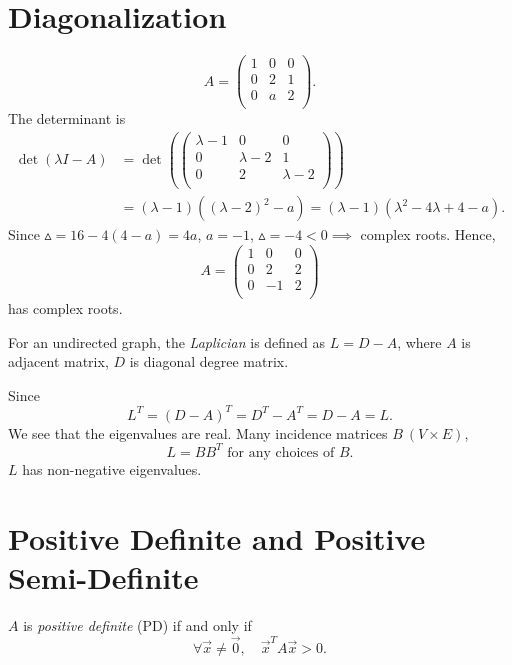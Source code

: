 \section{Diagonalization}
\begin{eg}
	\[
		A = \begin{pmatrix}
			1 & 0 & 0 \\
			0 & 2 & 1 \\
			0 & a & 2 \\
		\end{pmatrix}.
	\]
	The determinant is
	\[
		\begin{split}
			\det(\lambda I - A) &= \det \left(  \begin{pmatrix}
				\lambda - 1 & 0            & 0             \\
				0           & \lambda -  2 & 1             \\
				0           & 2            & \lambda -   2 \\
			\end{pmatrix}\right)\\
			&= (\lambda - 1)((\lambda - 2 )^2 - a) = (\lambda - 1)(\lambda^2 - 4\lambda + 4 - a).
		\end{split}
	\]
	Since \(\vartriangle = 16 - 4(4-a) = 4a\),  \(a = -1\), \(\vartriangle = -4 < 0 \implies\) complex roots. Hence,
	\[
		A = \begin{pmatrix}
			1 & 0  & 0 \\
			0 & 2  & 2 \\
			0 & -1 & 2 \\
		\end{pmatrix}
	\] has complex roots.
\end{eg}

\begin{definition}[Laplician]
	For an undirected graph, the \emph{Laplician} is defined as \(L = D - A\), where \(A\) is adjacent matrix, \(D\) is diagonal degree matrix.
\end{definition}
\begin{remark}
	Since \[
		L^{T} = (D - A)^{T} = D^{T} - A^{T} = D - A = L.
	\] We see that the eigenvalues are real. Many incidence matrices \(B\ (V\times  E)\),
	\[
		L = BB^{T} \text{ for any choices of }B.
	\]
	\(L\) has non-negative eigenvalues.
\end{remark}

\section{Positive Definite and Positive Semi-Definite}
\begin{definition}
	\(A \) is \emph{positive definite} (PD) if and only if
	\[
		\forall \vec{x} \neq  \vec{0},\quad \vec{x}^{T}A \vec{x} > 0.
	\]
\end{definition}

